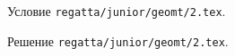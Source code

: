 \problem
Условие \texttt{regatta/junior/geomt/2.tex}.

\solution Решение \texttt{regatta/junior/geomt/2.tex}.
\endproblem
